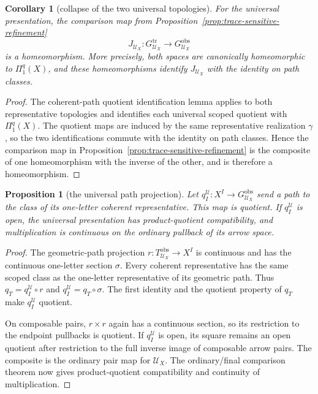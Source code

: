 \documentclass[10pt,reqno]{amsart}
\theoremstyle{definition}
\theoremstyle{plain}
\newtheorem{proposition}[definition]{Proposition}
\newtheorem{corollary}[definition]{Corollary}
\theoremstyle{remark}
\begin{document}
\begin{corollary}[collapse of the two universal topologies]
\label{cor:universal-topology-collapse}
For the universal presentation, the comparison map from
Proposition~\ref{prop:trace-sensitive-refinement}
\[
  J_{\mathcal U_X}:G_{\mathcal U_X}^{\mathrm{tr}}
    \longrightarrow G_{\mathcal U_X}^{\mathrm{obs}}
\]
is a homeomorphism.  More precisely, both spaces are canonically
homeomorphic to $\Pi_1^q(X)$, and these homeomorphisms identify
$J_{\mathcal U_X}$ with the identity on path classes.
\end{corollary}

\begin{proof}
The coherent-path quotient identification lemma applies to both representative
topologies and identifies each universal scoped quotient with
$\Pi_1^q(X)$.  The quotient maps are induced by the same representative
realization $\gamma$, so the two identifications commute with the identity on
path classes.  Hence the comparison map in
Proposition~\ref{prop:trace-sensitive-refinement}
is the composite of one homeomorphism with the inverse of the other, and is
therefore a homeomorphism.
\end{proof}

\begin{proposition}[the universal path projection]
\label{prop:universal-path-projection}
Let $q_I^{\mathcal U}:X^I\to G_{\mathcal U_X}^{\mathrm{obs}}$ send a path to
the class of its one-letter coherent representative.  This map is quotient.
If $q_I^{\mathcal U}$ is open, the universal presentation has
product-quotient compatibility, and multiplication is continuous on the
ordinary pullback of its arrow space.
\end{proposition}

\begin{proof}
The geometric-path projection $r:T_{\mathcal U_X}^{\mathrm{obs}}\to X^I$
is continuous and has the continuous one-letter section $\sigma$.
Every coherent representative has the same scoped class as the one-letter
representative of its geometric path.  Thus
$q_T=q_I^{\mathcal U}\circ r$ and
$q_I^{\mathcal U}=q_T\circ\sigma$.  The first identity and the quotient
property of $q_T$ make $q_I^{\mathcal U}$ quotient.

On composable pairs, $r\times r$ again has a continuous section, so its
restriction to the endpoint pullbacks is quotient.  If
$q_I^{\mathcal U}$ is open, its square remains an open quotient after
restriction to the full inverse image of composable arrow pairs.
The composite is the ordinary pair map for $\mathcal U_X$.
The ordinary/final comparison theorem now gives product-quotient
compatibility and continuity of multiplication.
\end{proof}
\end{document}
